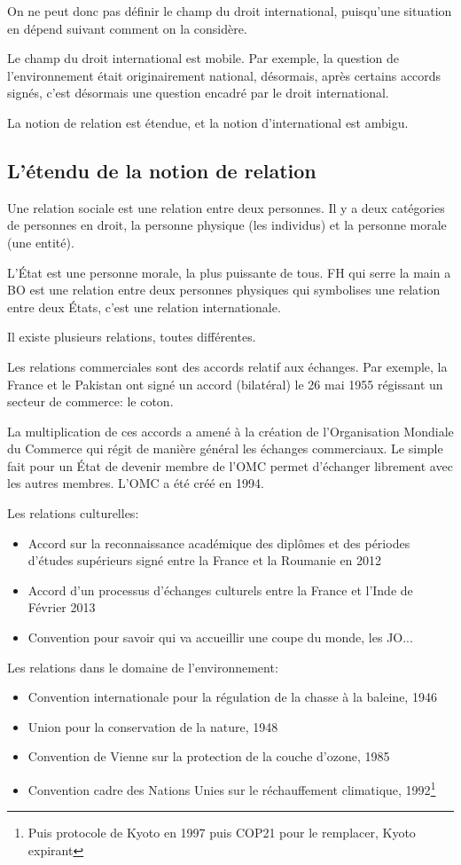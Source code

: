 ﻿\documentclass[12pt, a4paper, openany]{book}
\begin{document}
On ne peut donc pas définir le champ du droit international, puisqu'une situation en dépend suivant comment on la considère.

Le champ du droit international est mobile. Par exemple, la question de l'environnement était originairement national, désormais, après certains accords signés, c'est désormais une question encadré par le droit international. 

La notion de relation est étendue, et la notion d'international est ambigu.

		\subsection{L'étendu de la notion de relation}

Une relation sociale est une relation entre deux personnes. Il y a deux catégories de personnes en droit, la personne physique (les individus) et la personne morale (une entité).

L'État est une personne morale, la plus puissante de tous. FH qui serre la main a BO est une relation entre deux personnes physiques qui symbolises une relation entre deux États, c'est une relation internationale.

Il existe plusieurs relations, toutes différentes.

Les relations commerciales sont des accords relatif aux échanges. Par exemple, la France et le Pakistan ont signé un accord (bilatéral) le 26 mai 1955 régissant un secteur de commerce: le coton.

La multiplication de ces accords a amené à la création de l'Organisation Mondiale du Commerce qui régit de manière général les échanges commerciaux. Le simple fait pour un État de devenir membre de l'OMC permet d'échanger librement avec les autres membres. L'OMC a été créé en 1994.


Les relations culturelles:
\begin{itemize}
\item Accord sur la reconnaissance académique des diplômes et des périodes d'études supérieurs signé entre la France et la Roumanie en 2012
\item Accord d'un processus d'échanges culturels entre la France et l'Inde de Février 2013
\item Convention pour savoir qui va accueillir une coupe du monde, les JO...
\end{itemize}

Les relations dans le domaine de l'environnement:
\begin{itemize}
\item Convention internationale pour la régulation de la chasse à la baleine, 1946
\item Union pour la conservation de la nature, 1948
\item Convention de Vienne sur la protection de la couche d'ozone, 1985
\item Convention cadre des Nations Unies sur le réchauffement climatique, 1992\footnote{Puis protocole de Kyoto en 1997 puis COP21 pour le remplacer, Kyoto expirant}
\end{itemize}
\end{document}
